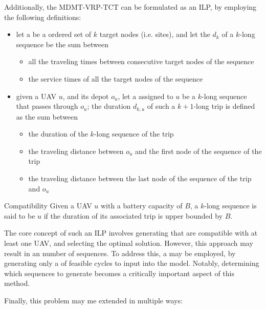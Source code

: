 \documentclass[a4paper, 12pt]{report}
\begin{document}
    Additionally, the MDMT-VRP-TCT can be formulated as an ILP, by employing the following definitions:

    \begin{itemize}
        \item let a  be a ordered set of $k$ target nodes (i.e. sites), and let the  $d_k$ of a $k$-long sequence be the sum between
            \begin{itemize}
                \item all the traveling times between consecutive target nodes of the sequence
                \item the service times of all the target nodes of the sequence
            \end{itemize}
        \item given a UAV $u$, and its depot $o_u$, let a  assigned to $u$ be a $k$-long sequence that passes through $o_u$; the duration $d_{k,u}$ of such a $k + 1$-long trip is defined as the sum between
            \begin{itemize}
                \item the duration of the $k$-long sequence of the trip
                \item the traveling distance between $o_u$ and the first node of the sequence of the trip
                \item the traveling distance between the last node of the sequence of the trip and $o_u$
            \end{itemize}
    \end{itemize}

    \begin{frameddefn}{Compatibility}
        Given a UAV $u$ with a battery capacity of $B$, a $k$-long sequence is said to be  $u$ if the duration of its associated trip is upper bounded by $B$.
    \end{frameddefn}

    The core concept of such an ILP involves generating  that are compatible with at least one UAV, and selecting the optimal solution. However, this approach may result in an  number of sequences. To address this, a  may be employed, by generating only a  of feasible cycles to input into the model. Notably, determining which sequences to generate becomes a critically important aspect of this method.

    Finally, this problem may me extended in multiple ways:
\end{document}
